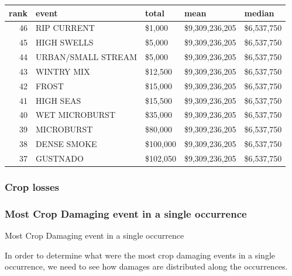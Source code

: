 \documentclass[]{article}
\begin{document}
\begin{longtable}[]{@{}rllll@{}}
\toprule
rank & event & total & mean & median\tabularnewline
\midrule
\endhead
46 & RIP CURRENT & \$1,000 & \$9,309,236,205 &
\$6,537,750\tabularnewline
45 & HIGH SWELLS & \$5,000 & \$9,309,236,205 &
\$6,537,750\tabularnewline
44 & URBAN/SMALL STREAM & \$5,000 & \$9,309,236,205 &
\$6,537,750\tabularnewline
43 & WINTRY MIX & \$12,500 & \$9,309,236,205 &
\$6,537,750\tabularnewline
42 & FROST & \$15,000 & \$9,309,236,205 & \$6,537,750\tabularnewline
41 & HIGH SEAS & \$15,500 & \$9,309,236,205 & \$6,537,750\tabularnewline
40 & WET MICROBURST & \$35,000 & \$9,309,236,205 &
\$6,537,750\tabularnewline
39 & MICROBURST & \$80,000 & \$9,309,236,205 &
\$6,537,750\tabularnewline
38 & DENSE SMOKE & \$100,000 & \$9,309,236,205 &
\$6,537,750\tabularnewline
37 & GUSTNADO & \$102,050 & \$9,309,236,205 & \$6,537,750\tabularnewline
\bottomrule
\end{longtable}

\subsubsection{Crop losses}\label{crop-losses}

\subsubsection{Most Crop Damaging event in a single
occurrence}\label{most-crop-damaging-event-in-a-single-occurrence}

Most Crop Damaging event in a single occurrence

In order to determine what were the most crop damaging events in a
single occurrence, we need to see how damages are distributed along the
occurrences.
\end{document}
